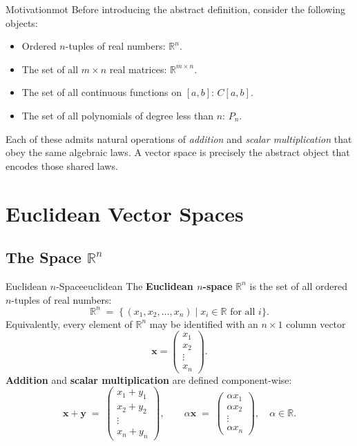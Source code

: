 \documentclass[12pt]{article}
\newcommand{\R}{\mathbb{R}}
\newcommand{\vv}[1]{\mathbf{#1}}
\begin{document}
	\begin{remark}{Motivation}{mot}
		Before introducing the abstract definition, consider the following objects:
		\begin{itemize}[leftmargin=2em]
			\item Ordered $n$-tuples of real numbers: $\R^n$.
			\item The set of all $m \times n$ real matrices: $\R^{m \times n}$.
			\item The set of all continuous functions on $[a,b]$: $C[a,b]$.
			\item The set of all polynomials of degree less than $n$: $P_n$.
		\end{itemize}
		Each of these admits natural operations of \emph{addition} and \emph{scalar
			multiplication} that obey the same algebraic laws.  A vector space is precisely
		the abstract object that encodes those shared laws.
	\end{remark}
	

	\section{Euclidean Vector Spaces}
	
	
	\subsection{The Space \texorpdfstring{$\R^n$}{Rn}}
	
	\begin{definition}{Euclidean $n$-Space}{euclidean}
		The \textbf{Euclidean $n$-space} $\R^n$ is the set of all ordered $n$-tuples of
		real numbers:
		\[
		\R^n \;=\; \bigl\{\, (x_1, x_2, \ldots, x_n) \;\big|\; x_i \in \R \text{ for all } i \bigr\}.
		\]
		Equivalently, every element of $\R^n$ may be identified with an $n \times 1$
		column vector
		\[
		\vv{x} = \begin{pmatrix} x_1 \\ x_2 \\ \vdots \\ x_n \end{pmatrix}.
		\]
		\textbf{Addition} and \textbf{scalar multiplication} are defined component-wise:
		\[
		\vv{x} + \vv{y}
		\;=\;
		\begin{pmatrix} x_1 + y_1 \\ x_2 + y_2 \\ \vdots \\ x_n + y_n \end{pmatrix},
		\qquad
		\alpha\vv{x}
		\;=\;
		\begin{pmatrix} \alpha x_1 \\ \alpha x_2 \\ \vdots \\ \alpha x_n \end{pmatrix},
		\quad \alpha \in \R.
		\]
	\end{definition}
	
\end{document}
